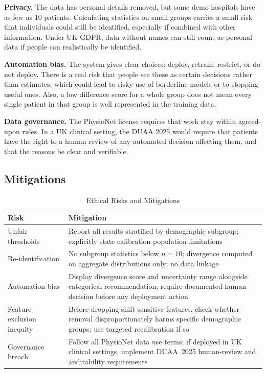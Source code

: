 \textbf{Privacy.} The data has personal details removed, but some demo hospitals have as few as 10 patients. Calculating statistics on small groups carries a small risk that individuals could still be identified, especially if combined with other information. Under UK GDPR, data without names can still count as personal data if people can realistically be identified.

\textbf{Automation bias.} The system gives clear choices: deploy, retrain, restrict, or do not deploy. There is a real risk that people see these as certain decisions rather than estimates, which could lead to risky use of borderline models or to stopping useful ones. Also, a low difference score for a whole group does not mean every single patient in that group is well represented in the training data.

\textbf{Data governance.} The PhysioNet license requires that work stay within agreed-upon rules. In a UK clinical setting, the DUAA 2025 would require that patients have the right to a human review of any automated decision affecting them, and that the reasons be clear and verifiable.

\subsection{Mitigations}

\begin{table}[H]
\centering
\caption{Ethical Risks and Mitigations}
\label{tab:ethics_mitigations}
\begin{tabular}{p{3cm}p{5cm}}
\toprule
\textbf{Risk} & \textbf{Mitigation} \\
\midrule
Unfair thresholds
  & Report all results stratified by demographic subgroup; explicitly state calibration population limitations \\
Re-identification
  & No subgroup statistics below $n=10$; divergence computed on aggregate distributions only; no data linkage \\
Automation bias
  & Display divergence score and uncertainty range alongside categorical recommendation; require documented human decision before any deployment action \\
Feature exclusion inequity
  & Before dropping shift-sensitive features, check whether removal disproportionately harms specific demographic groups; use targeted recalibration if so \\
Governance breach
  & Follow all PhysioNet data use terms; if deployed in UK clinical settings, implement DUAA~2025 human-review and auditability requirements \\
\bottomrule
\end{tabular}
\end{table}